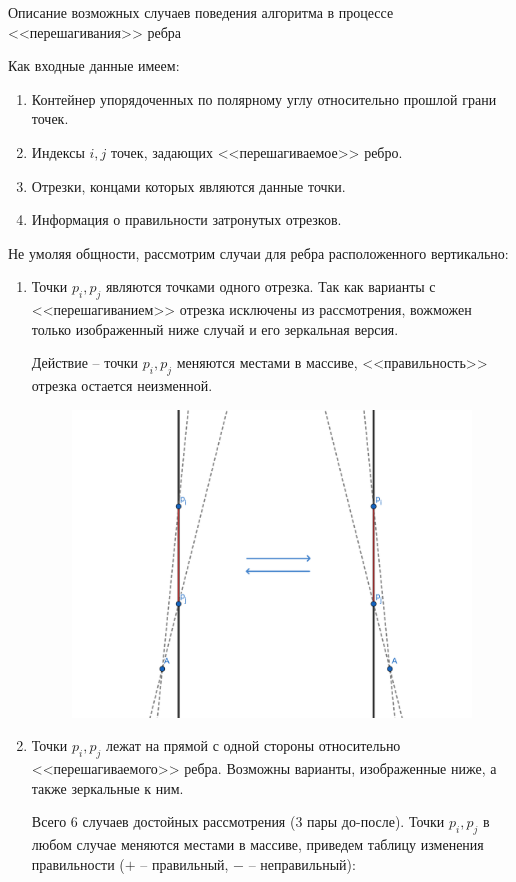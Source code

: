 \documentclass[letterpaper,12pt]{article}
\begin{document}
\begin{center}
Описание возможных случаев поведения алгоритма в процессе <<перешагивания>>
ребра
\end{center}
Как входные данные имеем: 
\begin{enumerate}
      \item Контейнер упорядоченных по полярному углу относительно
            прошлой грани точек.
      \item Индексы $i, j$ точек, задающих <<перешагиваемое>> ребро.
      \item Отрезки, концами которых являются данные точки.
      \item Информация о правильности затронутых отрезков.
\end{enumerate}
Не умоляя общности, рассмотрим случаи для ребра расположенного вертикально:
\begin{enumerate}
      \item Точки $p_i, p_j$ являются точками одного отрезка. Так как
            варианты с <<перешагиванием>> отрезка исключены из рассмотрения,
            вожможен только изображенный ниже случай и его зеркальная версия.
            
            Действие -- точки $p_i, p_j$ меняются местами в массиве, 
            <<правильность>> отрезка остается неизменной.
            \begin{figure}[h]
                  \centering
                  \includegraphics[width=.5\linewidth]{one_segment.png}
            \end{figure}
      \item Точки $p_i, p_j$ лежат на прямой с одной стороны относительно
            <<перешагиваемого>> ребра. Возможны варианты, изображенные ниже,
            а также зеркальные к ним.
            
            Всего 6 случаев достойных рассмотрения (3 пары до-после).
            Точки $p_i, p_j$ в любом случае меняются местами в массиве,
            приведем таблицу изменения правильности 
            ($+$ -- правильный, $-$ -- неправильный):
            

\end{enumerate}
\end{document}
